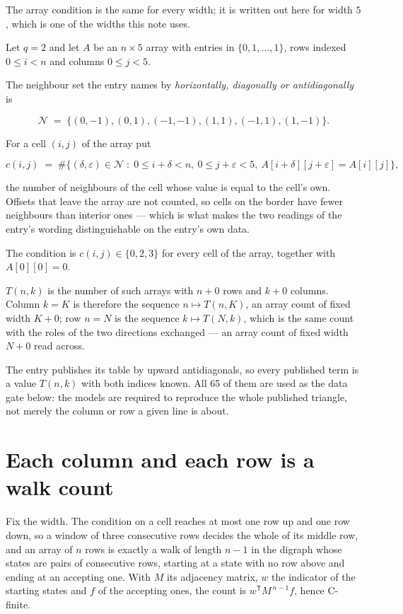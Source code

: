 \documentclass[11pt]{article}
\theoremstyle{definition}
\begin{document}
The array condition is the same for every width; it is written out here for width $5$, which is one of the widths this note uses.

Let $q = 2$ and let $A$ be an $n \times 5$ array with entries in $\{0,1,\dots,1\}$, rows indexed $0 \le i < n$ and columns $0 \le j < 5$.

The neighbour set the entry names by {\itshape horizontally, diagonally or antidiagonally} is

\[\mathcal{N} \;=\; \{(0,-1), (0,1), (-1,-1), (1,1), (-1,1), (1,-1)\}.\]

For a cell $(i,j)$ of the array put

\[c(i,j) \;=\; \#\bigl\{(\delta,\varepsilon)\in\mathcal{N} \;:\; 0\le i+\delta<n,\ 0\le j+\varepsilon<5,\ A[i+\delta][j+\varepsilon] = A[i][j]\bigr\},\]

the number of neighbours of the cell whose value is equal to the cell's own. Offsets that leave the array are not counted, so cells on the border have fewer neighbours than interior ones --- which is what makes the two readings of the entry's wording distinguishable on the entry's own data.

The condition is $c(i,j) \in \{0, 2, 3\}$ for every cell of the array, together with $A[0][0]=0$.

$T(n,k)$ is the number of such arrays with $n + 0$ rows and $k + 0$ columns. Column $k = K$ is therefore the sequence $n \mapsto T(n,K)$, an array count of fixed width $K + 0$; row $n = N$ is the sequence $k \mapsto T(N,k)$, which is the same count with the roles of the two directions exchanged --- an array count of fixed width $N + 0$ read across.

The entry publishes its table by upward antidiagonals, so every published term is a value $T(n,k)$ with both indices known. All 65 of them are used as the data gate below: the models are required to reproduce the whole published triangle, not merely the column or row a given line is about.

\section{Each column and each row is a walk count}

Fix the width. The condition on a cell reaches at most one row up and one row down, so a window of three consecutive rows decides the whole of its middle row, and an array of $n$ rows is exactly a walk of length $n-1$ in the digraph whose states are pairs of consecutive rows, starting at a state with no row above and ending at an accepting one. With $M$ its adjacency matrix, $w$ the indicator of the starting states and $f$ of the accepting ones, the count is $w^{\mathsf T}M^{\,n-1}f$, hence C-finite.
\end{document}
